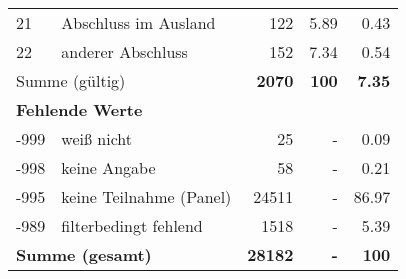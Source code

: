 \begin{longtable}{lXrrr}
     21 &
     \multicolumn{1}{X}{ Abschluss im Ausland   } &


       \num{122} &
       \num[round-mode=places,round-precision=2]{5,89} &
         \num[round-mode=places,round-precision=2]{0,43} \\

     22 &
     \multicolumn{1}{X}{ anderer Abschluss   } &


       \num{152} &
       \num[round-mode=places,round-precision=2]{7,34} &
         \num[round-mode=places,round-precision=2]{0,54} \\
     \midrule
     \multicolumn{2}{l}{Summe (gültig)} &
       \textbf{\num{2070}} &
     \textbf{100} &
       \textbf{\num[round-mode=places,round-precision=2]{7,35}} \\
     \multicolumn{5}{l}{\textbf{Fehlende Werte}}\\
       -999 &
       weiß nicht &
         \num{25} &
        - &
         \num[round-mode=places,round-precision=2]{0,09} \\
       -998 &
       keine Angabe &
         \num{58} &
        - &
         \num[round-mode=places,round-precision=2]{0,21} \\
       -995 &
       keine Teilnahme (Panel) &
         \num{24511} &
        - &
         \num[round-mode=places,round-precision=2]{86,97} \\
       -989 &
       filterbedingt fehlend &
         \num{1518} &
        - &
         \num[round-mode=places,round-precision=2]{5,39} \\
     \midrule
     \multicolumn{2}{l}{\textbf{Summe (gesamt)}} &
          \textbf{\num{28182}} &
        \textbf{-} &
        \textbf{100} \\
     \bottomrule
     \end{longtable}
     
